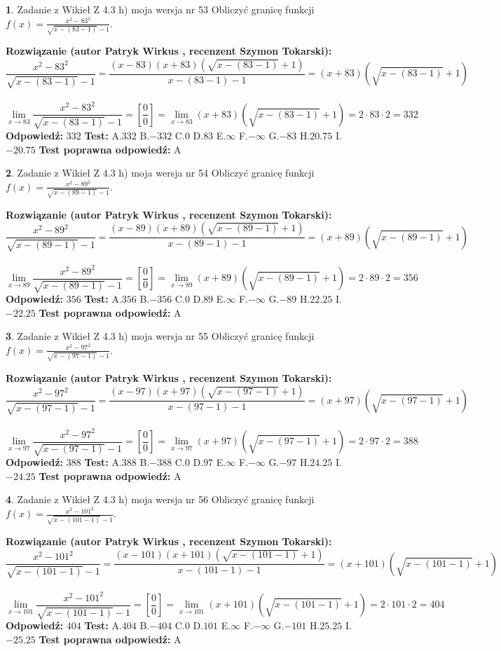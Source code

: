 \documentclass[12pt, a4paper]{article}
\theoremstyle{definition} %
\newtheorem{zad}{}
\newcommand{\zadStart}[1]{\begin{zad}#1\newline}
\newcommand{\zadStop}{\end{zad}}
\newcommand{\rozwStart}[2]{\noindent \textbf{Rozwiązanie (autor #1 , recenzent #2): }\newline}
\newcommand{\rozwStop}{\newline}
\newcommand{\odpStart}{\noindent \textbf{Odpowiedź:}\newline}
\newcommand{\odpStop}{\newline}
\newcommand{\testStart}{\noindent \textbf{Test:}\newline}
\newcommand{\testStop}{\newline}
\newcommand{\kluczStart}{\noindent \textbf{Test poprawna odpowiedź:}\newline}
\newcommand{\kluczStop}{\newline}
\begin{document}
\zadStart{Zadanie z Wikieł Z 4.3 h) moja wersja nr 53}
Obliczyć granicę funkcji $f(x)=\frac{x^{2} - 83^{2}}{\sqrt{x-(83-1)}-1}$.
\zadStop
\rozwStart{Patryk Wirkus}{Szymon Tokarski}
$$\frac{x^{2} - 83^{2}}{\sqrt{x-(83-1)}-1}=\frac{(x-83)(x+83)(\sqrt{x-(83-1)}+1)}{x-(83-1)-1}=(x+83)(\sqrt{x-(83-1)}+1)$$
\\
$$\lim\limits_{x\to 83}\frac{x^{2} - 83^{2}}{\sqrt{x-(83-1)}-1}=[\frac{0}{0}]=
\lim\limits_{x\to 83}(x+83)(\sqrt{x-(83-1)}+1) = 2\cdot83 \cdot 2 = 332$$
\rozwStop
\odpStart
$332$
\odpStop
\testStart
A.$332$
B.$-332$
C.$0$
D.$83$
E.$\infty$
F.$-\infty$
G.$-83$
H.$20.75$
I.$-20.75$
\testStop
\kluczStart
A
\kluczStop



\zadStart{Zadanie z Wikieł Z 4.3 h) moja wersja nr 54}
Obliczyć granicę funkcji $f(x)=\frac{x^{2} - 89^{2}}{\sqrt{x-(89-1)}-1}$.
\zadStop
\rozwStart{Patryk Wirkus}{Szymon Tokarski}
$$\frac{x^{2} - 89^{2}}{\sqrt{x-(89-1)}-1}=\frac{(x-89)(x+89)(\sqrt{x-(89-1)}+1)}{x-(89-1)-1}=(x+89)(\sqrt{x-(89-1)}+1)$$
\\
$$\lim\limits_{x\to 89}\frac{x^{2} - 89^{2}}{\sqrt{x-(89-1)}-1}=[\frac{0}{0}]=
\lim\limits_{x\to 89}(x+89)(\sqrt{x-(89-1)}+1) = 2\cdot89 \cdot 2 = 356$$
\rozwStop
\odpStart
$356$
\odpStop
\testStart
A.$356$
B.$-356$
C.$0$
D.$89$
E.$\infty$
F.$-\infty$
G.$-89$
H.$22.25$
I.$-22.25$
\testStop
\kluczStart
A
\kluczStop



\zadStart{Zadanie z Wikieł Z 4.3 h) moja wersja nr 55}
Obliczyć granicę funkcji $f(x)=\frac{x^{2} - 97^{2}}{\sqrt{x-(97-1)}-1}$.
\zadStop
\rozwStart{Patryk Wirkus}{Szymon Tokarski}
$$\frac{x^{2} - 97^{2}}{\sqrt{x-(97-1)}-1}=\frac{(x-97)(x+97)(\sqrt{x-(97-1)}+1)}{x-(97-1)-1}=(x+97)(\sqrt{x-(97-1)}+1)$$
\\
$$\lim\limits_{x\to 97}\frac{x^{2} - 97^{2}}{\sqrt{x-(97-1)}-1}=[\frac{0}{0}]=
\lim\limits_{x\to 97}(x+97)(\sqrt{x-(97-1)}+1) = 2\cdot97 \cdot 2 = 388$$
\rozwStop
\odpStart
$388$
\odpStop
\testStart
A.$388$
B.$-388$
C.$0$
D.$97$
E.$\infty$
F.$-\infty$
G.$-97$
H.$24.25$
I.$-24.25$
\testStop
\kluczStart
A
\kluczStop



\zadStart{Zadanie z Wikieł Z 4.3 h) moja wersja nr 56}
Obliczyć granicę funkcji $f(x)=\frac{x^{2} - 101^{2}}{\sqrt{x-(101-1)}-1}$.
\zadStop
\rozwStart{Patryk Wirkus}{Szymon Tokarski}
$$\frac{x^{2} - 101^{2}}{\sqrt{x-(101-1)}-1}=\frac{(x-101)(x+101)(\sqrt{x-(101-1)}+1)}{x-(101-1)-1}=(x+101)(\sqrt{x-(101-1)}+1)$$
\\
$$\lim\limits_{x\to 101}\frac{x^{2} - 101^{2}}{\sqrt{x-(101-1)}-1}=[\frac{0}{0}]=
\lim\limits_{x\to 101}(x+101)(\sqrt{x-(101-1)}+1) = 2\cdot101 \cdot 2 = 404$$
\rozwStop
\odpStart
$404$
\odpStop
\testStart
A.$404$
B.$-404$
C.$0$
D.$101$
E.$\infty$
F.$-\infty$
G.$-101$
H.$25.25$
I.$-25.25$
\testStop
\kluczStart
A
\kluczStop
\end{document}
